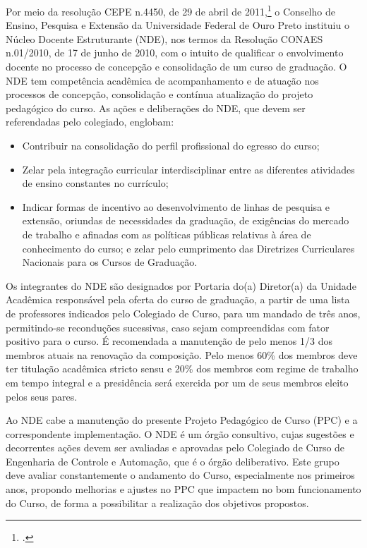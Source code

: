 \documentclass[
	12pt,				%
	openright,			%
	oneside,			%
	a4paper,			%
	english,			%
	brazil				%
	]{abntex2}
\begin{document}
Por meio da resolução CEPE n.4450, de 29 de abril de 2011,\footcite{resolucao-cepe-4450} o Conselho de Ensino, Pesquisa e Extensão da Universidade Federal de Ouro Preto instituiu o Núcleo Docente Estruturante (NDE), nos termos da Resolução CONAES n.01/2010, de 17 de junho de 2010, com o intuito de qualificar o envolvimento docente no processo de concepção e consolidação de um curso de graduação. O NDE tem competência acadêmica de acompanhamento e de atuação nos processos de concepção, consolidação e contínua atualização do projeto pedagógico do curso.
As ações e deliberações do NDE, que devem ser referendadas pelo colegiado, englobam:

\begin{itemize}
\item Contribuir na consolidação do perfil profissional do egresso do curso;

\item Zelar pela integração curricular interdisciplinar entre as diferentes atividades de ensino constantes no currículo;

\item Indicar formas de incentivo ao desenvolvimento de linhas de pesquisa e extensão, oriundas de necessidades da graduação, de exigências do mercado de trabalho e afinadas com as políticas públicas relativas à área de conhecimento do curso; e zelar pelo cumprimento das Diretrizes Curriculares Nacionais para os Cursos de Graduação.
\end{itemize}

Os integrantes do NDE são designados por Portaria do(a) Diretor(a) da Unidade Acadêmica responsável pela oferta do curso de graduação, a partir de uma lista de professores indicados pelo Colegiado de Curso, para um mandado de três anos, permitindo-se reconduções sucessivas, caso sejam compreendidas com fator positivo para o curso. É recomendada a manutenção de pelo menos 1/3 dos membros atuais na renovação da composição. Pelo menos 60\% dos membros deve ter titulação acadêmica stricto sensu e 20\% dos membros com regime de trabalho em tempo integral e a presidência será exercida por um de seus membros eleito pelos seus pares.

Ao NDE cabe a manutenção do presente Projeto Pedagógico de Curso (PPC) e a correspondente implementação. O NDE é um órgão consultivo, cujas sugestões e decorrentes ações devem ser avaliadas e aprovadas pelo Colegiado de Curso de Engenharia de Controle e Automação, que é o órgão deliberativo. Este grupo deve avaliar constantemente o andamento do Curso, especialmente nos primeiros anos, propondo melhorias e ajustes no PPC que impactem no bom funcionamento do Curso, de forma a possibilitar a realização dos objetivos propostos.
\end{document}
